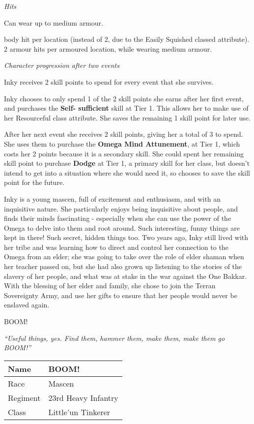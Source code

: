 \documentclass{scrbook}
\begin{document}
\textit{Hits}

Can wear up to medium armour.

body hit per location (instead of 2, due to the Easily Squished classed attribute). 2 armour hits per armoured location, while wearing medium armour.

\textit{Character progression after two events}

Inky receives 2 skill points to spend for every event that she survives.

Inky chooses to only spend 1 of the 2 skill points she earns after her first event, and purchases the \textbf{Self- sufficient} skill at Tier 1. This allows her to make use of her Resourceful class attribute. She saves the remaining 1 skill point for later use.

After her next event she receives 2 skill points, giving her a total of 3 to spend. She uses them to purchase the \textbf{Omega Mind Attunement}, at Tier 1, which costs her 2 points because it is a secondary skill. She could spent her remaining skill point to purchase \textbf{Dodge} at Tier 1, a primary skill for her class, but doesn't intend to get into a situation where she would need it, so chooses to save the skill point for the future.

Inky is a young mascen, full of excitement and enthusiasm, and with an inquisitive nature. She particularly enjoys being inquisitive about people, and finds their minds fascinating - especially when she can use the power of the Omega to delve into them and root around. Such interesting, funny things are kept in there! Such secret, hidden things too. Two years ago, Inky still lived with her tribe and was learning how to direct and control her connection to the Omega from an elder; she was going to take over the role of elder shaman when her teacher passed on, but she had also grown up listening to the stories of the slavery of her people, and what was at stake in the war against the One Bakkar. With the blessing of her elder and family, she chose to join the Terran Sovereignty Army, and use her gifts to ensure that her people would never be enslaved again.

BOOM!

\textit{``Useful things, yes. Find them, hammer them, make them, make them go BOOM!''}

\begin{table}
\begin{tabular}{|l|l|} \hline 
Name & BOOM! \\
 \hline Race & Mascen \\
 \hline Regiment & 23rd Heavy Infantry \\
 \hline Class & Little'un Tinkerer \\
 \hline \end{tabular}

\end{table}
\end{document}
